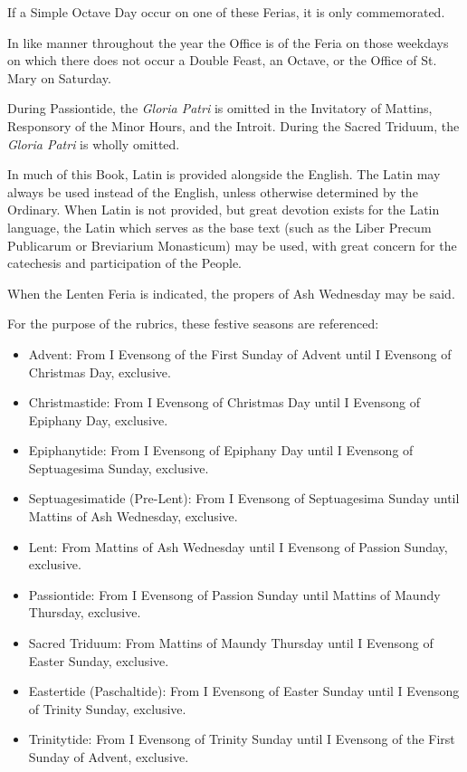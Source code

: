 \begin{description}
If a Simple Octave Day occur on one of these Ferias, it is only commemorated.\par
In like manner throughout the year the Office is of the Feria on those weekdays on which there does not occur a Double Feast, an Octave, or the Office of St. Mary on Saturday.
\item[Gloria Patri] During Passiontide, the \emph{Gloria Patri} is omitted in the Invitatory of Mattins, Responsory of the Minor Hours, and the Introit. During the Sacred Triduum, the \emph{Gloria Patri} is wholly omitted.
\item[Latin] In much of this Book, Latin is provided alongside the English. The Latin may always be used instead of the English, unless otherwise determined by the Ordinary. When Latin is not provided, but great devotion exists for the Latin language, the Latin which serves as the base text (such as the Liber Precum Publicarum or Breviarium Monasticum) may be used, with great concern for the catechesis and participation of the People.
\item[Lenten Ferias] When the Lenten Feria is indicated, the propers of Ash Wednesday may be said.
\item[Liturgical Seasons] For the purpose of the rubrics, these festive seasons are referenced:
    \begin{itemize}
    	\item Advent: From I Evensong of the First Sunday of Advent until I Evensong of Christmas Day, exclusive.
        \item Christmastide: From I Evensong of Christmas Day until I Evensong of Epiphany Day, exclusive.%
        \item Epiphanytide: From I Evensong of Epiphany Day until I Evensong of Septuagesima Sunday, exclusive.
        \item Septuagesimatide (Pre-Lent): From I Evensong of Septuagesima Sunday until Mattins of Ash Wednesday, exclusive.
        \item Lent: From Mattins of Ash Wednesday until I Evensong of Passion Sunday, exclusive.
        \item Passiontide: From I Evensong of Passion Sunday until Mattins of Maundy Thursday, exclusive.
        \item Sacred Triduum: From Mattins of Maundy Thursday until I Evensong of Easter Sunday, exclusive.
        \item Eastertide (Paschaltide): From I Evensong of Easter Sunday until I Evensong of Trinity Sunday, exclusive.
        \item Trinitytide: From I Evensong of Trinity Sunday until I Evensong of the First Sunday of Advent, exclusive.
    \end{itemize}


\end{description}
